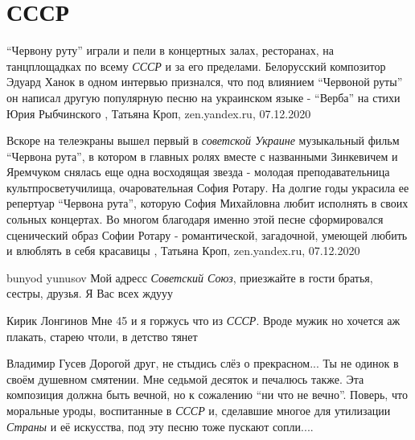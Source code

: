  
 
 
 
 
\chapter{СССР}
\label{sec:slova.sssr}

\enquote{Червону руту} играли и пели в концертных залах, ресторанах, на танцплощадках
по всему \emph{СССР} и за его пределами. Белорусский композитор Эдуард Ханок в одном
интервью признался, что под влиянием \enquote{Червоной руты} он написал другую
популярную песню на украинском языке - \enquote{Верба} на стихи Юрия Рыбчинского
, 
Татьяна Кроп, zen.yandex.ru, 07.12.2020

Вскоре на телеэкраны вышел первый в \emph{советской Украине} музыкальный фильм
\enquote{Червона рута}, в котором в главных ролях вместе с названными Зинкевичем и
Яремчуком снялась еще одна восходящая звезда - молодая преподавательница
культпросветучилища, очаровательная София Ротару.  На долгие годы украсила ее
репертуар \enquote{Червона рута}, которую София Михайловна любит исполнять в своих
сольных концертах. Во многом благодаря именно этой песне сформировался
сценический образ Софии Ротару - романтической, загадочной, умеющей любить и
влюблять в себя красавицы
, 
Татьяна Кроп, zen.yandex.ru, 07.12.2020

bunyod yunusov
Мой адресс \emph{Советский Союз}, приезжайте в гости братья, сестры, друзья. Я Вас всех ждууу

Кирик Лонгинов
Мне 45 и я горжусь что из \emph{СССР}. Вроде мужик но хочется аж плакать,
старею чтоли, в детство тянет 

Владимир Гусев
Дорогой друг, не стыдись слёз о прекрасном... Ты не одинок в своём душевном
смятении. Мне седьмой десяток и печалюсь также. Эта композиция должна быть
вечной, но к сожалению \enquote{ни что не вечно}. Поверь, что моральные уроды,
воспитанные в \emph{СССР} и, сделавшие многое для утилизации \emph{Страны} и её искусства,
под эту песню тоже пускают сопли.... 

